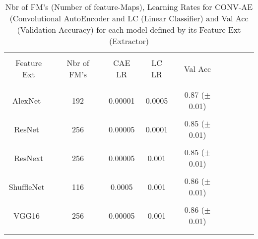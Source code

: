 \documentclass[conference]{IEEEtran}
\begin{document}
            \begin{table}[htbp]
            \centering
            \caption{Nbr of FM's (Number of feature-Maps), Learning Rates for CONV-AE (Convolutional AutoEncoder and LC (Linear Classifier) and Val Acc (Validation Accuracy) for each model defined by its Feature Ext (Extractor)}
            \begin{tabular}{c c c c c c c c c}
            \hline\\
            Feature Ext &   Nbr of FM's & CAE LR  & LC LR &   Val Acc  \\\\ 
            \hline\\
            AlexNet~\cite{alexnet}   & 192 &0.00001 & 0.0005 &  0.87 ($\pm$0.01)  \\\\
            ResNet~\cite{resnet}    & 256 &0.00005 & 0.0001 &  0.85 ($\pm$0.01)  \\\\
            ResNext\cite{resnext}     & 256 &0.00005 & 0.001  &  0.85 ($\pm$0.01)  \\\\
            ShuffleNet~\cite{shufflenetv2}  & 116 &0.0005  & 0.001  &  0.86 ($\pm$0.01)  \\\\
            VGG16~\cite{vgg16}     & 256 &0.00005 & 0.001  &  0.86 ($\pm$0.01) \\\\
            \hline\\
            \end{tabular}
            \end{table}	
\end{document}
